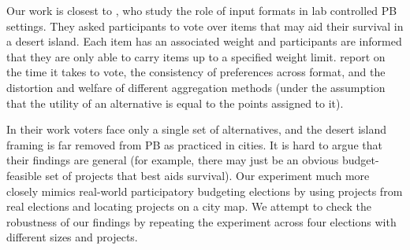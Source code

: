 \documentclass[runningheads]{llncs}
\begin{document}
Our work is closest to  \citet{benade2018efficiency}, who study the role of input formats in lab controlled PB settings. They asked participants  to vote over items that may aid their survival in a desert island. Each item has an associated weight and participants are informed that they are only able to carry items up to a specified weight limit. %
\citet{benade2018efficiency} report on the time it takes to vote, the consistency of preferences across format, and the distortion and welfare of different aggregation methods (under the assumption that the utility of an alternative is equal to the points assigned to it). %

In their work voters face only a single set of alternatives, and the desert island framing is far removed from PB as practiced in cities.  It is  hard  to argue that their findings are general  (for example, there may just be an obvious budget-feasible set of projects that best aids survival).   Our experiment much more closely mimics real-world participatory budgeting elections by using projects from real elections and  locating projects on a city map. We   attempt to check the robustness of our findings by repeating the experiment across four elections with different sizes and projects. %
\end{document}
